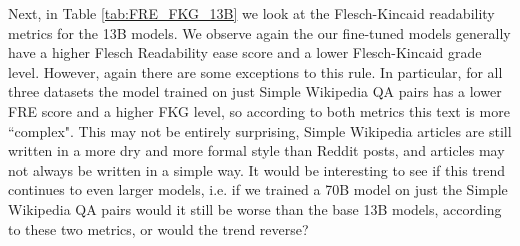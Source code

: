\documentclass[11pt, oneside]{article}   	%
\begin{document}
Next, in Table \ref{tab:FRE_FKG_13B} we look at the Flesch-Kincaid readability metrics for the 13B models. 
We observe again the our fine-tuned models generally have a higher Flesch Readability ease score and a lower Flesch-Kincaid grade level.
However, again there are some exceptions to this rule.
In particular, for all three datasets the model trained on just Simple Wikipedia QA pairs has a lower FRE score and a higher FKG level, so according to both metrics this text is more ``complex".
This may not be entirely surprising, Simple Wikipedia articles are still written in a more dry and more formal style than Reddit posts, and articles may not always be written in a simple way. 
It would be interesting to see if this trend continues to even larger models, i.e. if we trained a 70B model on just the Simple Wikipedia QA pairs would it still be worse than the base 13B models, according to these two metrics, or would the trend reverse?
\end{document}
